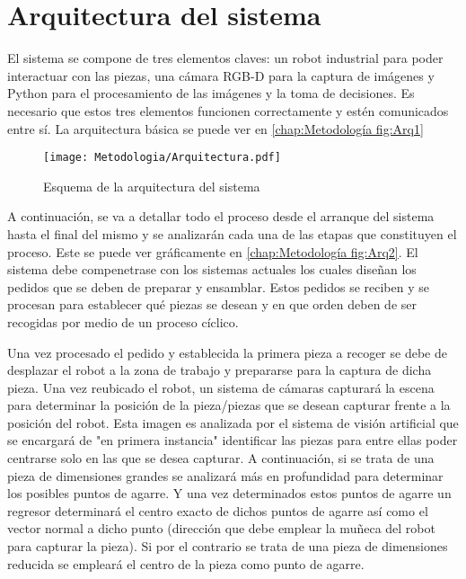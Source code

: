 \section{Arquitectura del sistema}
\label{chap:Metodología sec:Arquitectura}
El sistema se compone de tres elementos claves: un robot industrial para poder interactuar con las piezas, una cámara RGB-D para la captura de imágenes y Python para el procesamiento de las imágenes y la toma de decisiones. Es necesario que estos tres elementos funcionen correctamente y estén comunicados entre sí. La arquitectura básica se puede ver en \autoref{chap:Metodología fig:Arq1}

\begin{figure}[ht]
	\centering
	\texttt{[image: Metodologia/Arquitectura.pdf]}
	\caption{Esquema de la arquitectura del sistema}
	\label{chap:Metodología fig:Arq1}
	\vspace{-5pt}
\end{figure}

A continuación, se va a detallar todo el proceso desde el arranque del sistema hasta el final del mismo y se analizarán cada una de las etapas que constituyen el proceso. Este se puede ver gráficamente en \autoref{chap:Metodología fig:Arq2}. El sistema debe compenetrase con los sistemas actuales los cuales diseñan los pedidos que se deben de preparar y ensamblar. Estos pedidos se reciben y se procesan para establecer qué piezas se desean y en que orden deben de ser recogidas por medio de un proceso cíclico.

Una vez procesado el pedido y establecida la primera pieza a recoger se debe de desplazar el robot a la zona de trabajo y prepararse  para la captura de dicha pieza. Una vez reubicado el robot, un sistema de cámaras capturará la escena para determinar la posición de la pieza/piezas que se desean capturar frente a la posición del robot. Esta imagen es analizada por el sistema de visión artificial que se encargará de "en primera instancia" identificar las piezas para entre ellas poder centrarse solo en las que se desea capturar. A continuación, si se trata de una pieza de dimensiones grandes se analizará más en profundidad para determinar los posibles puntos de agarre. Y una vez determinados estos puntos de agarre un regresor determinará el centro exacto de dichos puntos de agarre así como el vector normal a dicho punto (dirección que debe emplear la muñeca del robot para capturar la pieza). Si por el contrario se trata de una pieza de dimensiones reducida se empleará el centro de la pieza como punto de agarre.

